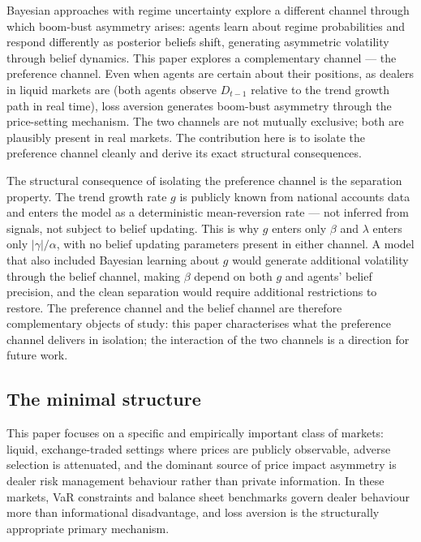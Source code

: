 \documentclass[12pt,a4paper]{article}
\theoremstyle{definition}
\begin{document}
Bayesian approaches with regime uncertainty \citep{veronesi1999,hamilton1989}
explore a different channel through which boom-bust asymmetry arises: agents
learn about regime probabilities and respond differently as posterior beliefs
shift, generating asymmetric volatility through belief dynamics. This paper
explores a complementary channel --- the preference channel. Even when agents
are certain about their positions, as dealers in liquid markets are (both
agents observe $D_{t-1}$ relative to the trend growth path in real time),
loss aversion generates boom-bust asymmetry through the price-setting
mechanism. The two channels are not mutually exclusive; both are plausibly
present in real markets. The contribution here is to isolate the preference
channel cleanly and derive its exact structural consequences.

The structural consequence of isolating the preference channel is the
separation property. The trend growth rate $g$ is publicly known
from national accounts data and enters the model as a deterministic
mean-reversion rate --- not inferred from signals, not subject to belief
updating. This is why $g$ enters only $\beta$ and $\lambda$ enters only
$|\gamma|/\alpha$, with no belief updating parameters present in either
channel. A model that also included Bayesian learning about $g$ would
generate additional volatility through the belief channel, making $\beta$
depend on both $g$ and agents' belief precision, and the clean separation
would require additional restrictions to restore. The preference channel
and the belief channel are therefore complementary objects of study:
this paper characterises what the preference channel delivers in isolation;
the interaction of the two channels is a direction for future work.

\subsection{The minimal structure}
\label{sec:minimal}

This paper focuses on a specific and empirically important class of markets:
liquid, exchange-traded settings where prices are publicly observable, adverse
selection is attenuated, and the dominant source of price impact asymmetry
is dealer risk management behaviour rather than private information. In these
markets, VaR constraints and balance sheet benchmarks govern dealer behaviour
more than informational disadvantage, and loss aversion is the structurally
appropriate primary mechanism.
\end{document}
